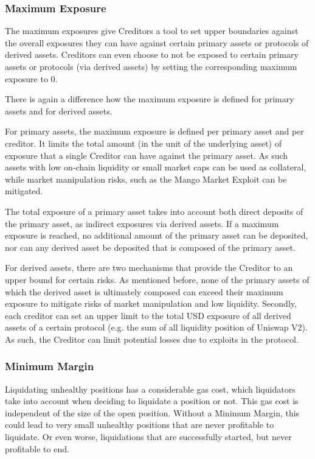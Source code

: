 \documentclass[sigconf,nonacm]{acmart}
\begin{document}
\subsubsection{Maximum Exposure}
The maximum exposures give Creditors a tool to set upper boundaries against the overall exposures they can have against certain primary assets or protocols of derived assets.
Creditors can even choose to not be exposed to certain primary assets or protocols (via derived assets) by setting the corresponding maximum exposure to 0.

There is again a difference how the maximum exposure is defined for primary assets and for derived assets.

For primary assets, the maximum exposure is defined per primary asset and per creditor.
It limits the total amount (in the unit of the underlying asset) of exposure that a single Creditor can have against the primary asset.
As such assets with low on-chain liquidity or small market caps can be used as collateral,
while market manipulation risks, such as the Mango Market Exploit\cite{coindeskDeFiExchange} can be mitigated.

The total exposure of a primary asset takes into account both direct deposits of the primary asset, as indirect exposures via derived assets.
If a maximum exposure is reached, no additional amount of the primary asset can be deposited, nor can any derived asset be deposited that is composed of the primary asset.

For derived assets, there are two mechanisms that provide the Creditor to an upper bound for certain risks.
As mentioned before, none of the primary assets of which the derived asset is ultimately composed can exceed their maximum exposure to mitigate risks of market manipulation and low liquidity.
Secondly, each creditor can set an upper limit to the total USD exposure of all derived assets of a certain protocol (e.g. the sum of all liquidity position of Uniswap V2).
As such, the Creditor can limit potential losses due to exploits in the protocol.

\subsubsection{Minimum Margin}
Liquidating unhealthy positions has a considerable gas cost, which liquidators take into account when deciding to liquidate a position or not.
This gas cost is independent of the size of the open position.
Without a Minimum Margin, this could lead to very small unhealthy positions that are never profitable to liquidate.
Or even worse, liquidations that are successfully started, but never profitable to end.
\end{document}
